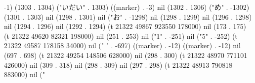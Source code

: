 -1) (1303 . 1304) ("いだい" . 1303) ((marker) . -3) nil (1302 . 1306) ("め" . -1302) (1301 . 1303) nil (1298 . 1301) nil ("お" . -1298) nil (1298 . 1299) nil (1296 . 1298) nil (1294 . 1296) nil (1292 . 1294) (t 21322 49867 923550 178000) nil (173 . 175) (t 21322 49620 82321 198000) nil (251 . 253) nil ("1" . -251) nil ("5" . -252) (t 21322 49587 178158 34000) nil ("%
" . -697) ((marker) . -12) ((marker) . -12) nil (697 . 698) (t 21322 49254 148506 628000) nil (298 . 300) (t 21322 48970 771101 426000) nil (309 . 318) nil (298 . 309) nil (297 . 298) (t 21322 48913 790818 883000) nil ("
